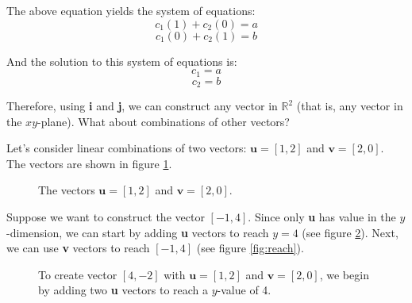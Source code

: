The above equation yields the system of equations:
$$c_1 \left( 1 \right) + c_2 \left( 0 \right) = a$$
$$c_1 \left( 0 \right) + c_2 \left( 1 \right) = b$$

And the solution to this system of equations is:
$$c_1 = a$$
$$c_2 = b$$

Therefore, using \textbf{i} and \textbf{j}, we can construct any vector in 
$\mathbb{R}^2$ (that is, any vector in the $xy$-plane). What about combinations 
of other vectors?

Let's consider linear combinations of two vectors: $\textbf{u} = \left[ 1, 2 
\right]$ and $\textbf{v} = \left[2, 0 \right]$. The vectors are shown in 
figure \ref{fig:u_and_v}. 

\begin{figure}[htbp]
    \centering
    \caption{The vectors $\textbf{u} = \left[ 1, 2 \right]$ and $\textbf{v} = 
    \left[ 2, 0 \right]$.}
    \label{fig:u_and_v}
\end{figure}

Suppose we want to construct the vector $\left[ -1, 4 \right]$. Since only 
\textbf{u} has value in the $y$-dimension, we can start by adding \textbf{u} 
vectors to reach $y = 4$ (see figure \ref{fig:just_u}). Next, we can use 
\textbf{v} vectors to reach $\left[ -1, 4 \right]$ (see figure \ref{fig:reach}). 

\begin{figure}[htbp]
    \centering
    \caption{To create vector $\left[ 4, -2 \right]$ with $\textbf{u} = \left[
    1, 2 \right]$ and $\textbf{v} = \left[2, 0 \right]$, we begin by adding two 
    \textbf{u} vectors to reach a $y$-value of 4.}
    \label{fig:just_u}
\end{figure}

